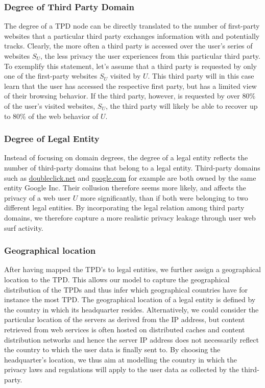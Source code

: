 \documentclass[compsoc, conference, letterpaper, 10pt, times]{IEEEtran}
\begin{document}
\subsubsection{Degree of Third Party Domain}
The degree of a TPD node can be directly translated to the number of first-party websites that a particular third party exchanges information with and potentially tracks. Clearly, the more often a third party is accessed over the user's series of websites $S_U$, the less privacy the user experiences from this particular third party. To exemplify this statement, let's assume that a third party is requested by only one of the first-party websites $S_U$ visited by $U$. This third party will in this case learn that the user has accessed the respective first party, but has a limited view of their browsing behavior. If the third party, however, is requested by over 80\% of the user's visited websites, $S_U$, the third party will likely be able to recover up to 80\% of the web behavior of $U$.


\subsubsection{Degree of Legal Entity}
\label{sec:legal_entity}
Instead of focusing on domain degrees, the degree of a legal entity reflects the number of third-party domains that belong to a legal entity. Third-party domains such as \url{doubleclick.net} and \url{google.com} for example are both owned by the same entity Google Inc. Their collusion therefore seems more likely, and affects the privacy of a web user $U$ more significantly, than if both were belonging to two different legal entities. By incorporating the legal relation among third party domains, we therefore capture a more realistic privacy leakage through user web surf activity.

\subsubsection{Geographical location}
After having mapped the TPD's to legal entities, we further assign a geographical location to the TPD. This allows our model to capture the geographical distribution of the TPDs and thus infer which geographical countries have for instance the most TPD. The geographical location of a legal entity is defined by the country in which its headquarter resides. Alternatively, we could consider the particular location of the servers as derived from the IP address, but content retrieved from web services is often hosted on distributed caches and content distribution networks and hence the server IP address does not necessarily reflect the country to which the user data is finally sent to. By choosing the headquarter's location, we thus aim at modelling the country in which the privacy laws and regulations will apply to the user data as collected by the third-party. 
\end{document}
